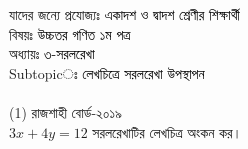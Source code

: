 \documentclass{article}
\begin{document}
 
	\Large
	যাদের জন্যে প্রযোজ্যঃ  	\textcolor{black}{একাদশ ও দ্বাদশ শ্রেণীর শিক্ষার্থী} \\
বিষয়ঃ \textcolor{black}{উচ্চতর গণিত ১ম পত্র} \\
অধ্যায়ঃ \textcolor{black}{৩-সরলরেখা }\\ 
Subtopicঃ \textcolor{black}{লেখচিত্রে সরলরেখা উপস্থাপন}\\	
\\
(1) রাজশাহী বোর্ড-২০১৯\\
$3x+4y=12$ সরলরেখাটির লেখচিত্র অংকন কর। \\
\end{document}
